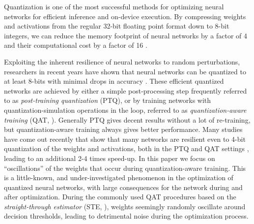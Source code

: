 Quantization is one of the most successful methods for optimizing neural networks for efficient inference and on-device execution. By compressing weights and activations from the regular 32-bit floating point format down to 8-bit integers, we can reduce the memory footprint of neural networks by a factor of 4 and their computational cost by a factor of 16 \citep{whitepaper, horowitz}. 

Exploiting the inherent resilience of neural networks to random perturbations, researchers in recent years have shown that neural networks can be quantized to at least 8-bits with minimal drops in accuracy \citep{}. These efficient quantized networks are achieved by either a simple post-processing step frequently referred to as \textit{post-training quantization} (PTQ), or by training networks with quantization-simulation operations in the loop, referred to as \textit{quantization-aware training} (QAT, \citet{krishnamoorthi}). 
Generally PTQ gives decent results without a lot of re-training, but quantization-aware training always gives better performance.
Many studies have come out recently that show that many networks are resilient even to 4-bit quantization of the weights and activations, both in the PTQ and QAT settings \cite{adaround, brecq, lsq}, leading to an additional 2-4 times speed-up.
In this paper we focus on ``oscillations'' of the weights that occur during quantization-aware training. This is a little-known, and under-investigated phenomenon in the optimization of quantized neural networks, with large consequences for the network during and after optimization. During the commonly used QAT procedures based on the \textit{straight-through estimator} (STE, \citet{bengio2013estimating, hinton2012ste}), weights seemingly randomly oscillate around decision thresholds, leading to detrimental noise during the optimization process. 


